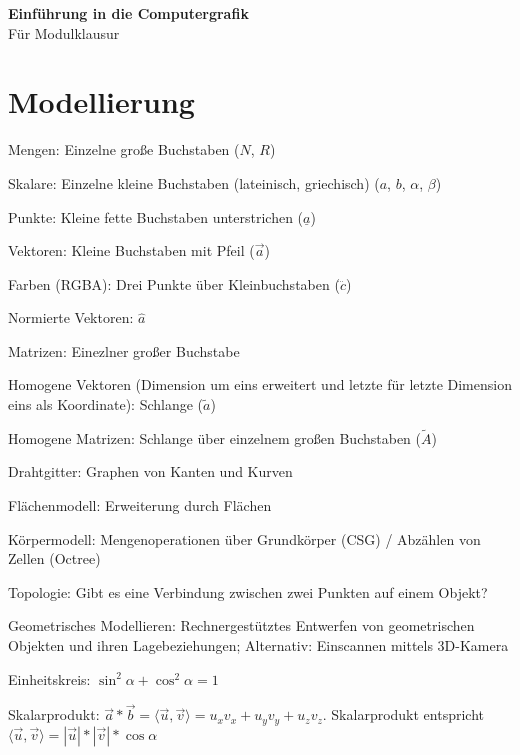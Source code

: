 \documentclass[12pt,landscape]{article}
\begin{document}
\footnotesize
\begin{multicols}{3}

\begin{center}
     \Large{\textbf{Einführung in die Computergrafik}} \\
     \small{Für Modulklausur}
\end{center}
\section{Modellierung}
\begin{compactitem}
\item Mengen: Einzelne große Buchstaben ($N$, $R$)
\item Skalare: Einzelne kleine Buchstaben (lateinisch, griechisch) ($a$, $b$, $\alpha$, $\beta$)
\item Punkte: Kleine fette Buchstaben unterstrichen ($\underline{a}$)
\item Vektoren: Kleine Buchstaben mit Pfeil ($\vec{a}$)
\item Farben (RGBA): Drei Punkte über Kleinbuchstaben ($\dddot{c}$)
\item Normierte Vektoren: $\hat{a}$
\item Matrizen: Einezlner großer Buchstabe
\item Homogene Vektoren (Dimension um eins erweitert und letzte für letzte Dimension eins als Koordinate): Schlange ($\tilde{a}$)
\item Homogene Matrizen: Schlange über einzelnem großen Buchstaben ($\tilde{A}$)
\end{compactitem}
\begin{compactitem}
\item Drahtgitter: Graphen von Kanten und Kurven
\item Flächenmodell: Erweiterung durch Flächen
\item Körpermodell: Mengenoperationen über Grundkörper (CSG) / Abzählen von Zellen (Octree)
\item Topologie: Gibt es eine Verbindung zwischen zwei Punkten auf einem Objekt?
\item Geometrisches Modellieren: Rechnergestütztes Entwerfen von geometrischen Objekten und ihren Lagebeziehungen; Alternativ: Einscannen mittels 3D-Kamera
\item Einheitskreis: $\sin^2 \alpha + \cos^2 \alpha = 1$ 
\item Skalarprodukt: $\vec{a} * \vec{b} = \langle \vec{u}, \vec{v} \rangle = u_{x}v_{x} + u_{y}v_{y} + u_{z}v_{z}$. Skalarprodukt entspricht $\langle \vec{u}, \vec{v} \rangle = |\vec{u}| * |\vec{v}| * \cos \alpha$

\end{compactitem}
\end{multicols}
\end{document}
